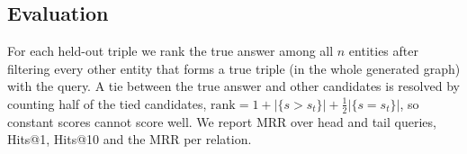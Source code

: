 \subsection{Evaluation}
For each held-out triple we rank the true answer among all $n$ entities after filtering every other entity that forms a true triple (in the whole generated graph) with the query. A tie between the true answer and other candidates is resolved by counting half of the tied candidates, $\mathrm{rank}=1+|\{s>s_t\}|+\tfrac12|\{s=s_t\}|$, so constant scores cannot score well. We report MRR over head and tail queries, Hits@1, Hits@10 and the MRR per relation.
